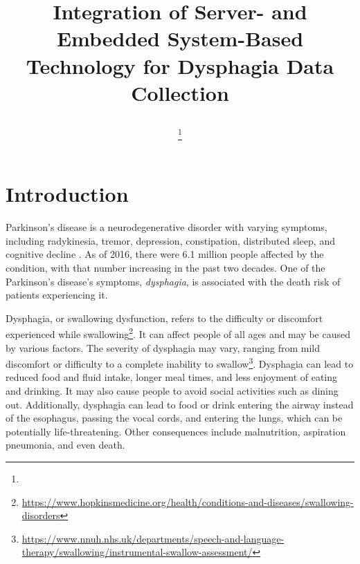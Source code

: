 \documentclass[lettersize,journal]{IEEEtran}
\begin{document}
\title{ Integration of Server- and Embedded System-Based Technology for Dysphagia Data Collection
\author{




\thanks{

}
}
}
\markboth{}%
{}

\maketitle


\section{Introduction}

Parkinson's disease is a neurodegenerative disorder with varying symptoms, including
radykinesia, tremor, depression, constipation, distributed sleep, and cognitive decline
\cite{bloem2021PD}. As of 2016, there were 6.1 million people affected by the condition,
with that number increasing in the past two decades.
One of the Parkinson's disease's symptoms, \textit{dysphagia}, is associated with the
death risk of patients experiencing it.


Dysphagia, or swallowing dysfunction, refers to the difficulty or discomfort experienced while swallowing\footnote{\url{https://www.hopkinsmedicine.org/health/conditions-and-diseases/swallowing-disorders}}. It can affect people of all ages and may be caused by various factors. The severity of dysphagia may vary, ranging from mild discomfort or difficulty to a complete inability to swallow\footnote{\url{https://www.nnuh.nhs.uk/departments/speech-and-language-therapy/swallowing/instrumental-swallow-assessment/}}. Dysphagia can lead to reduced food and fluid intake, longer meal times, and less enjoyment of eating and drinking. It may also cause people to avoid social activities such as dining out. Additionally, dysphagia can lead to food or drink entering the airway instead of the esophagus, passing the vocal cords, and entering the lungs, which can be potentially life-threatening. Other consequences include malnutrition, aspiration pneumonia, and even death.
\\
\end{document}
